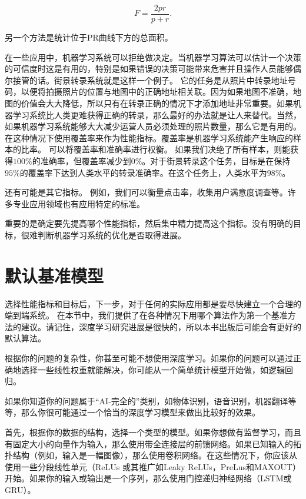 \begin{equation}
        F = \frac{2pr}{p+r}.
\end{equation}

另一个方法是统计位于PR曲线下方的总面积。

在一些应用中，机器学习系统可以拒绝做决定。当机器学习算法可以估计一个决策的可信度时这是有用的，特别是如果错误的决策可能带来危害并且操作人员能够偶尔接管的话。街景转录系统就是这样一个例子。 它的任务是从照片中转录地址号码，以便将拍摄照片的位置与地图中的正确地址相关联。因为如果地图不准确，地图的价值会大大降低，所以只有在转录正确的情况下才添加地址非常重要。如果机器学习系统比人类更难获得正确的转录，那么最好的办法就是让人来替代。当然，如果机器学习系统能够大大减少运营人员必须处理的照片数量，那么它是有用的。在这种情况下使用覆盖率来作为性能指标。覆盖率是机器学习系统能产生响应的样本的比率。 可以将覆盖率和准确率进行权衡。 如果我们决绝了所有样本，则能获得$100\%$的准确率，但覆盖率减少到$0\%$。对于街景转录这个任务，目标是在保持$95\%$的覆盖率下达到人类水平的转录准确率。在这个任务上，人类水平为$98\%$。

还有可能是其它指标。 例如，我们可以衡量点击率，收集用户满意度调查等。许多专业应用领域也有应用特定的标准。

重要的是确定要先提高哪个性能指标，然后集中精力提高这个指标。没有明确的目标，很难判断机器学习系统的优化是否取得进展。


\section{默认基准模型}
\label{sec:11.2}

选择性能指标和目标后，下一步，对于任何的实际应用都是要尽快建立一个合理的端到端系统。 在本节中，我们提供了在各种情况下用哪个算法作为第一个基准方法的建议。请记住，深度学习研究进展是很快的，所以本书出版后可能会有更好的默认算法。

根据你的问题的复杂性，你甚至可能不想使用深度学习。如果你的问题可以通过正确地选择一些线性权重就能解决，你可能从一个简单统计模型开始做，如逻辑回归。

如果你知道你的问题属于“AI-完全的”类别，如物体识别，语音识别，机器翻译等等，那么你很可能通过一个恰当的深度学习模型来做出比较好的效果。

首先，根据你的数据的结构，选择一个类型的模型。如果你想做有监督学习，而且有固定大小的向量作为输入，那么使用带全连接层的前馈网络。如果已知输入的拓扑结构（例如，输入是一幅图像），那么使用卷积网络。在这些情况下，你应该从使用一些分段线性单元（ReLUs 或其推广如Leaky ReLUs，PreLus和MAXOUT）开始。如果你的输入或输出是一个序列，那么使用门控递归神经网络（LSTM或GRU）。

